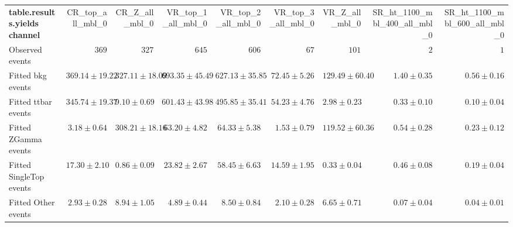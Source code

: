 

\begin{table}
\begin{center}
\setlength{\tabcolsep}{0.0pc}
{\small
\begin{tabular*}{\textwidth}{@{\extracolsep{\fill}}lrrrrrrrr}
\noalign{\smallskip}\hline\noalign{\smallskip}
{\bf table.results.yields channel}           & CR\_top\_all\_mbl\_0            & CR\_Z\_all\_mbl\_0            & VR\_top\_1\_all\_mbl\_0            & VR\_top\_2\_all\_mbl\_0            & VR\_top\_3\_all\_mbl\_0            & VR\_Z\_all\_mbl\_0            & SR\_ht\_1100\_mbl\_400\_all\_mbl\_0            & SR\_ht\_1100\_mbl\_600\_all\_mbl\_0              \\[-0.05cm]
\noalign{\smallskip}\hline\noalign{\smallskip}
Observed events          & $369$              & $327$              & $645$              & $606$              & $67$              & $101$              & $2$              & $1$                    \\
\noalign{\smallskip}\hline\noalign{\smallskip}
Fitted bkg events         & $369.14 \pm 19.22$          & $327.11 \pm 18.09$          & $693.35 \pm 45.49$          & $627.13 \pm 35.85$          & $72.45 \pm 5.26$          & $129.49 \pm 60.40$          & $1.40 \pm 0.35$          & $0.56 \pm 0.16$              \\
\noalign{\smallskip}\hline\noalign{\smallskip}
        Fitted ttbar events         & $345.74 \pm 19.37$          & $9.10 \pm 0.69$          & $601.43 \pm 43.98$          & $495.85 \pm 35.41$          & $54.23 \pm 4.76$          & $2.98 \pm 0.23$          & $0.33 \pm 0.10$          & $0.10 \pm 0.04$              \\
        Fitted ZGamma events         & $3.18 \pm 0.64$          & $308.21 \pm 18.16$          & $63.20 \pm 4.82$          & $64.33 \pm 5.38$          & $1.53 \pm 0.79$          & $119.52 \pm 60.36$          & $0.54 \pm 0.28$          & $0.23 \pm 0.12$              \\
        Fitted SingleTop events         & $17.30 \pm 2.10$          & $0.86 \pm 0.09$          & $23.82 \pm 2.67$          & $58.45 \pm 6.63$          & $14.59 \pm 1.95$          & $0.33 \pm 0.04$          & $0.46 \pm 0.08$          & $0.19 \pm 0.04$              \\
        Fitted Other events         & $2.93 \pm 0.28$          & $8.94 \pm 1.05$          & $4.89 \pm 0.44$          & $8.50 \pm 0.84$          & $2.10 \pm 0.28$          & $6.65 \pm 0.71$          & $0.07 \pm 0.04$          & $0.04 \pm 0.01$              \\

\end{tabular*}}
\end{center}
\end{table}
